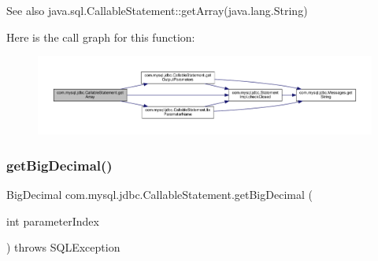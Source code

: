 \begin{DoxySeeAlso}{See also}
java.\+sql.\+Callable\+Statement\+::get\+Array(java.\+lang.\+String) 
\end{DoxySeeAlso}
Here is the call graph for this function\+:\nopagebreak
\begin{figure}[H]
\begin{center}
\leavevmode
\includegraphics[width=350pt]{classcom_1_1mysql_1_1jdbc_1_1_callable_statement_a6bc325b24afe0481026e3acedf399d1b_cgraph}
\end{center}
\end{figure}
\mbox{\label{classcom_1_1mysql_1_1jdbc_1_1_callable_statement_a53f2849edb219a3cb6e37e3a0f42a064}} 
\subsubsection{\texorpdfstring{get\+Big\+Decimal()}{getBigDecimal()}\hspace{0.1cm}{\footnotesize\ttfamily [1/3]}}
{\footnotesize\ttfamily Big\+Decimal com.\+mysql.\+jdbc.\+Callable\+Statement.\+get\+Big\+Decimal (\begin{DoxyParamCaption}\item[{int}]{parameter\+Index }\end{DoxyParamCaption}) throws S\+Q\+L\+Exception}

